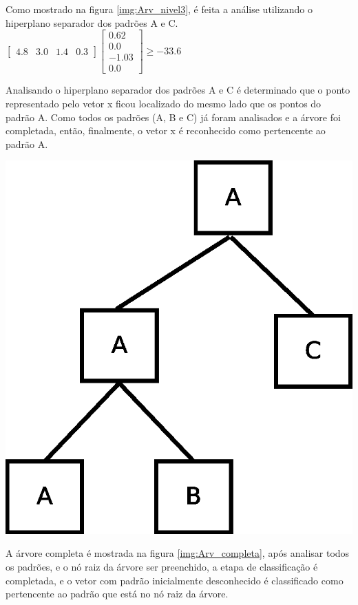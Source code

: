 Como mostrado na figura \ref{img:Arv_nivel3}, é feita a análise utilizando o hiperplano separador dos padrões A e C.
$ \begin{bmatrix}
4.8 & 3.0 & 1.4 & 0.3 
\end{bmatrix}
\begin{bmatrix}
0.62
\\ 
0.0
\\
-1.03
\\
0.0 
\end{bmatrix}
\geq  -33.6 $ 

Analisando o hiperplano separador dos padrões A e C é determinado que o ponto representado pelo vetor x ficou localizado do mesmo lado que os pontos do padrão A. Como todos os padrões (A, B e C) já foram analisados e a árvore foi completada, então, finalmente, o vetor x é reconhecido como pertencente ao padrão A.

\begin{center}
	\includegraphics[scale=0.4]{graficos/arvore_completa}
	\label{img:Arv_completa}
\end{center}

A árvore completa é mostrada na figura \ref{img:Arv_completa}, após analisar todos os padrões, e o nó raiz da árvore ser preenchido, a etapa de classificação é completada, e o vetor com padrão inicialmente desconhecido é classificado como pertencente ao padrão que está no nó raiz da árvore.

